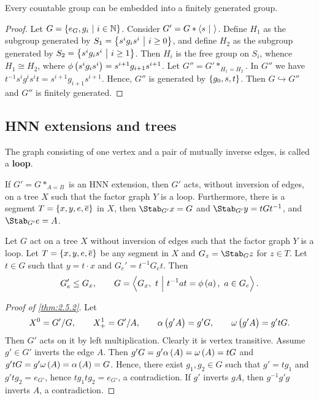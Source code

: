 \begin{lemma}
Every countable group can be embedded into a finitely generated group.
\end{lemma}

\begin{proof}
Let $ G = \cbr{e_G, g_i \st i \in \NN} $. Consider $ G' = G * \left\langle s \ \middle| \  \right\rangle $. Define $ H_1 $ as the subgroup generated by $ S_1 = \cbr{s^ig_is^i \st i \ge 0} $, and define $ H_2 $ as the subgroup generated by $ S_2 = \cbr{s^ig_is^i \st i \ge 1} $. Then $ H_i $ is the free group on $ S_i $, whence $ H_1 \cong H_2 $, where $ \phi\br{s^ig_is^i} = s^{i + 1}g_{i + 1}s^{i + 1} $. Let $ G'' = G' *_{H_1 = H_2} $. In $ G'' $ we have $ t^{-1}s^ig^is^it = s^{i + 1}g_{i + 1}s^{i + 1} $. Hence, $ G'' $ is generated by $ \cbr{g_0, s, t} $. Then $ G \hookrightarrow G'' $ and $ G'' $ is finitely generated.
\end{proof}

\subsection{HNN extensions and trees}

\begin{definition}
The graph consisting of one vertex and a pair of mutually inverse edges, is called a \textbf{loop}.
\end{definition}

\begin{theorem}
\label{thm:2.5.2}
If $ G' = G *_{A = B} $ is an HNN extension, then $ G' $ acts, without inversion of edges, on a tree $ X $ such that the factor graph $ Y $ is a loop. Furthermore, there is a segment $ T = \cbr{x, y, e, \overline{e}} $ in $ X $, then $ \Stab_{G'} x = G $ and $ \Stab_{G'} y = tGt^{-1} $, and $ \Stab_{G'} e = A $.
\end{theorem}

\begin{theorem}
Let $ G $ act on a tree $ X $ without inversion of edges such that the factor graph $ Y $ is a loop. Let $ T = \cbr{x, y, e, \overline{e}} $ be any segment in $ X $ and $ G_z = \Stab_G z $ for $ z \in T $. Let $ t \in G $ such that $ y = t \cdot x $ and $ G_e' = t^{-1}G_et $. Then
$$ G_e' \le G_x, \qquad G = \abr{G_x, \ t \st t^{-1}at = \phi\br{a}, \ a \in G_e}. $$
\end{theorem}

\begin{proof}[Proof of \ref{thm:2.5.2}]
Let
$$ X^0 = G' / G, \qquad X_+^1 = G' / A, \qquad \alpha\br{g'A} = g'G, \qquad \omega\br{g'A} = g'tG. $$
Then $ G' $ acts on it by left multiplication. Clearly it is vertex transitive. Assume $ g' \in G' $ inverts the edge $ A $. Then $ g'G = g'\alpha\br{A} = \omega\br{A} = tG $ and $ g'tG = g'\omega\br{A} = \alpha\br{A} = G $. Hence, there exist $ g_1, g_2 \in G $ such that $ g' = tg_1 $ and $ g'tg_2 = e_{G'} $, hence $ tg_1tg_2 = e_{G'} $, a contradiction. If $ g' $ inverts $ gA $, then $ g^{-1}g'g $ inverts $ A $, a contradiction.
\end{proof}

